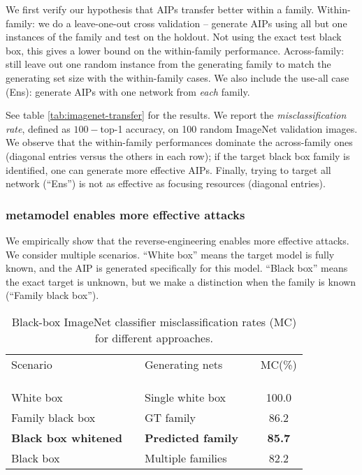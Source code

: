 \documentclass{article} %
\begin{document}
We first verify our hypothesis that AIPs transfer better within a family. Within-family: we do a leave-one-out cross validation -- generate AIPs using all but one instances of the family and test on the holdout. Not using the exact test black box, this gives a lower bound on the within-family performance. Across-family: still leave out one random instance from the generating family to match the generating set size with the within-family cases. We also include the use-all case (Ens): generate AIPs with one network from \emph{each} family.

See table \ref{tab:imagenet-transfer} for the results. We report the \emph{misclassification rate}, defined as $100-$top-1 accuracy, on 100 random ImageNet validation images. We observe that the within-family performances dominate the across-family ones (diagonal entries versus the others in each row); if the target black box family is identified, one can generate more effective AIPs. Finally, trying to target all network (``Ens'') is not as effective as focusing resources (diagonal entries).

\subsubsection*{metamodel enables more effective attacks}

We empirically show that the reverse-engineering enables more effective attacks. We consider multiple scenarios. ``White box'' means the target model is fully known, and the AIP is generated specifically for this model. ``Black box'' means the exact target is unknown, but we make a distinction when the family is known (``Family black box'').

\begin{wraptable}{r}{0.5\columnwidth}
\vspace{-1em}
\caption{\label{tab:imagenet-foolrate}Black-box ImageNet classifier misclassification rates (MC) for different approaches.}
\vspace{0em}
\begin{centering}
\setlength{\tabcolsep}{0.2em}
\begin{tabular}{lclcc}
Scenario&& Generating nets && MC(\%) \tabularnewline
\vspace{-1em} & \tabularnewline
\cline{1-1} \cline{3-3} \cline{5-5} 
\vspace{-0.9em} &  &  \tabularnewline
\cline{1-1} \cline{3-3} \cline{5-5} 
\vspace{-1em} &   \tabularnewline
White box && Single white box &  & 100.0 \tabularnewline
Family black box && GT family &  & 86.2 \tabularnewline{\bf Black box whitened}&&{\bf Predicted family} && {\bf 85.7} \tabularnewline
Black box && Multiple families && 82.2 \tabularnewline
\cline{1-1} \cline{3-3} \cline{5-5}
\end{tabular}
\par\end{centering}
\vspace{-0.5em}
\end{wraptable}
\end{document}
